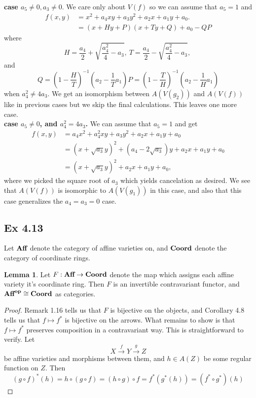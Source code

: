 \documentclass{article}
\theoremstyle{definition}
\newtheorem{lemma}[theorem]{Lemma}
\newcommand{\catname}[1]{{\normalfont\textbf{#1}}}
\newcommand{\op}{\catname{op}}
\begin{document}
\textbf{case $a_5 \not = 0, a_3 \not = 0$}. We care
only about $V(f)$ so we can assume that $a_5 = 1$ and 
\begin{align*}
	f(x, y) 
	&= 
	x^{2} + a_4 xy + a_3 y^{2} + a_2 x + a_1 y + a_0. \\
	&= 
	\left(
		x
		+
		Hy
		+
		P
	\right)
	\left(
		x
		+
		Ty
		+
		Q
	\right)
	+ 
	a_0 
	- 
	QP
\end{align*} 
where
\[
	H 
	= 
	\frac{a_4}{2} + \sqrt{\frac{a_4^{2}}{4} - a_3},\ 
	T 
	= 
	\frac{a_4}{2} - \sqrt{\frac{a_4^{2}}{4} - a_3},\ 
\] 
and
\[
	Q = \left(1 - \frac{H}{T}\right)^{-1}\left(a_2 - \frac{1}{T} a_1\right)
	P = \left(1 - \frac{T}{H}\right)^{-1}\left(a_2 - \frac{1}{H} a_1\right)
\] 
when $a_4^{2} \not = 4 a_3$. We get an isomorphism between $A(V(g_2))$ and $A(V(f))$ like in
previous cases but we skip the final calculations. This leaves one more case. \\

\textbf{case $a_5 \not = 0$, and $a_4^{2} = 4 a_3$.}
We can assume that $a_5 = 1$ and get
\begin{align*}
	f(x, y) 
	&= 
	a_4 x^{2} + a_4^{2} xy + a_3 y^{2} + a_2 x + a_1 y + a_0 \\
	&= 
	(x + \sqrt{a_3}y)^{2}
	+
	(a_4 - 2\sqrt{a_3}) y
	+
	a_2 x
	+ 
	a_1 y
	+ 
	a_0 \\
	&= 
	(x + \sqrt{a_3}y)^{2}
	+
	a_2 x
	+ 
	a_1 y
	+ 
	a_0,
\end{align*}
where we picked the square root of $a_3$ which yields cancelation as desired.
We see that $A(V(f))$ is isomorphic to $A(V(g_1))$ in this case, and also that
this case generalizes the $a_4 = a_3 = 0$ case.

\subsection*{Ex 4.13} 

Let $\catname{Aff}$ denote the category of affine varieties on, and
$\catname{Coord}$ denote the category of coordinate rings. 

\begin{lemma}
	Let $F : \catname{Aff} \to \catname{Coord}$ denote the map which assigns
	each affine variety it's coordinate ring. Then $F$ is an invertible
	contravariant functor, and $\catname{Aff}^{\op} \cong \catname{Coord}$ as
	categories.
\end{lemma}
\begin{proof}
	Remark 1.16 tells us that $F$ is bijective on the objects, and Corollary
	4.8 tells us that $f \mapsto f^{*}$ is bijective on the arrows. What
	remains to show is that $f \mapsto f^{*}$ preserves composition in a
	contravariant way. This is straightforward to verify. Let
	\[
		X \xrightarrow{f} Y \xrightarrow{g} Z
	\]
	be affine varieties and morphisms between them, and $h \in A(Z)$ be some
	regular function on $Z$. Then 
	\[
		(g \circ f)^{*}(h)
		=
		h \circ (g \circ f)
		=
		(h \circ g) \circ f
		=
		f^{*}(g^{*}(h))
		=
		(f^{*} \circ g^{*}) (h)
	\] 
\end{proof}
\end{document}
